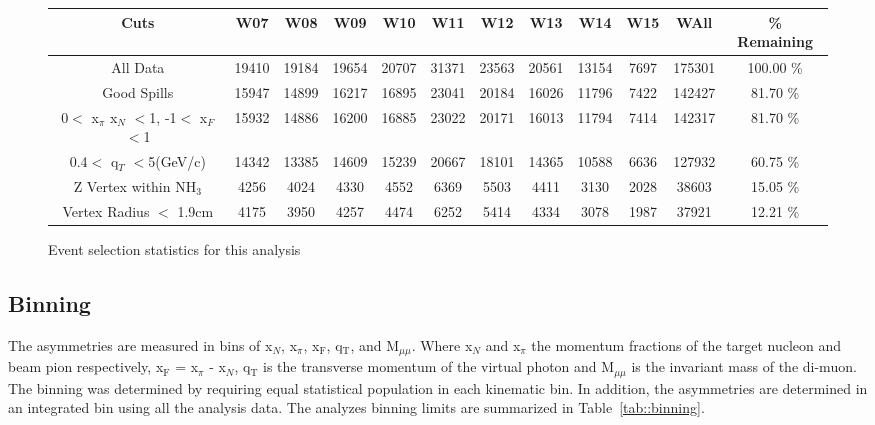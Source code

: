\begin{figure}[h!t]
  \begin{adjustwidth}{-2cm}{}
    \begin{tabular}{ |c|c|c|c|c|c|c|c|c|c|c|c| }
      \hline \textbf{Cuts}& \textbf{W07}& \textbf{W08}& \textbf{W09}&
      \textbf{W10}& \textbf{W11}& \textbf{W12}& \textbf{W13}& \textbf{W14}&
      \textbf{W15} & \textbf{WAll} & \textbf{\% Remaining} \\ \hline

      All Data& 19410& 19184& 19654& 20707& 31371& 23563& 20561& 13154& 7697&
      175301& 100.00 \% \\ \hline
      
      Good Spills& 15947& 14899& 16217& 16895& 23041& 20184& 16026& 11796& 7422&
      142427& 81.70 \% \\ \hline

      0$<$ x$_{\pi}$ x$_N$ $<$1, -1$<$ x$_F$ $<$1& 15932& 14886& 16200& 16885&
      23022& 20171& 16013& 11794& 7414& 142317& 81.70 \% \\ \hline

      0.4$<$ q$_T$ $<$5(GeV/c)& 14342& 13385& 14609& 15239& 20667& 18101& 14365&
      10588& 6636& 127932& 60.75 \% \\ \hline

      Z Vertex within NH$_3$& 4256& 4024& 4330& 4552& 6369& 5503& 4411& 3130&
      2028& 38603& 15.05 \% \\ \hline

      Vertex Radius $<$ 1.9cm& 4175& 3950& 4257& 4474& 6252& 5414& 4334& 3078&
      1987& 37921& 12.21 \% \\ \hline
      
    \end{tabular}
    \caption{Event selection statistics for this analysis}
    \label{tab::EventTable}
  \end{adjustwidth}
\end{figure}

\subsection{Binning}
The asymmetries are measured in bins of x$_N$, x$_{\pi}$, x$_{\mathrm{F}}$,
q$_{\mathrm{T}}$, and M$_{\mu\mu}$.  Where x$_N$ and x$_{\pi}$ the momentum
fractions of the target nucleon and beam pion respectively, x$_{\mathrm{F}}$ =
x$_{\pi}$ - x$_N$, q$_{\mathrm{T}}$ is the transverse momentum of the virtual
photon and M$_{\mu\mu}$ is the invariant mass of the di-muon.  The binning was
determined by requiring equal statistical population in each kinematic bin.  In
addition, the asymmetries are determined in an integrated bin using all the
analysis data.  The analyzes binning limits are summarized in
Table~\ref{tab::binning}.

